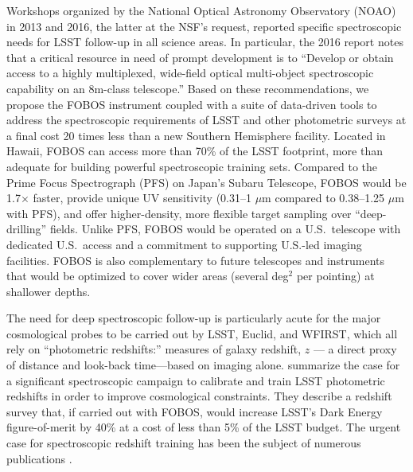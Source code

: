 \documentclass[oneside,11pt]{amsart}
\newcommand{\comment}[2][todo]{{\color{#1}[[{\bf #2}]]}}
\begin{document}
Workshops organized by the National Optical Astronomy Observatory (NOAO)
in 2013 and 2016, the latter at the NSF's request, reported specific
spectroscopic needs for LSST follow-up in all science areas.  In
particular, the 2016 report notes that a critical resource in need of
prompt development is to ``Develop or obtain access to a highly
multiplexed, wide-field optical multi-object spectroscopic capability on
an 8m-class telescope.''  Based on these recommendations, we propose the
FOBOS instrument coupled with a suite of data-driven tools to address
the spectroscopic requirements of LSST and other photometric surveys at
a final cost 20 times less than a new Southern Hemisphere facility.
Located in Hawaii, FOBOS can access more than 70\% of the LSST
footprint, more than adequate for building powerful
spectroscopic training sets.  Compared to the Prime Focus Spectrograph
(PFS) on Japan's Subaru Telescope, FOBOS would be 1.7$\times$ faster,
provide unique UV sensitivity (0.31--1 $\mu$m compared to
0.38--1.25 $\mu$m with PFS), and offer higher-density, more flexible
target sampling over ``deep-drilling'' fields.  Unlike PFS, FOBOS would be operated
on a U.S.\ telescope with dedicated U.S.\ access and a commitment to
supporting U.S.-led imaging facilities.  FOBOS is also complementary to
future telescopes and instruments that would be optimized to cover wider areas
(several deg$^2$ per pointing) at shallower depths.


The need for deep spectroscopic follow-up is particularly acute for the major cosmological probes to be carried out by
LSST, Euclid, and WFIRST, which all rely on ``photometric redshifts:'' measures of galaxy redshift, $z$
--- a direct proxy of distance and look-back time---based on imaging alone. \citet{newman15} summarize the case for a
    significant spectroscopic campaign to calibrate and train LSST photometric redshifts in order to improve cosmological constraints.  They describe a redshift survey that,
    if carried out with FOBOS, would increase LSST's Dark Energy figure-of-merit by 40\% at a cost of less than 5\% of
    the LSST budget.  The urgent case for spectroscopic redshift training has been the subject of numerous publications
    \citep[e.g.,][]{laureijs11, masters15, hemmati18}.
\end{document}

